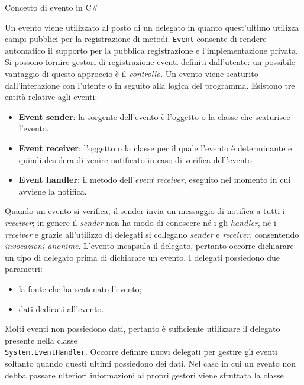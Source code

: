 \begin{problem}{1.8}
Concetto di evento in C\#
\end{problem}
\begin{solution}
Un evento viene utilizzato al posto di un delegato in quanto quest’ultimo utilizza campi pubblici per la registrazione di
metodi.
\newline
\texttt{Event} consente di rendere automatico il supporto per la pubblica registrazione e l’implementazione privata.
\newline
Si possono fornire gestori di registrazione eventi definiti dall’utente: un possibile vantaggio di questo approccio è il
\textit{controllo}.
\newline
Un evento viene scaturito dall’interazione con l’utente o in seguito alla logica del programma.
Esistono tre entità relative agli eventi:
\begin{itemize}
	\item \textbf{Event sender}: la sorgente dell’evento è l’oggetto o la classe che scaturisce l’evento.
	\item \textbf{Event receiver}: l’oggetto o la classe per il quale l’evento è determinante e quindi desidera di venire notificato
   in caso di verifica dell’evento
	\item \textbf{Event handler}: il metodo dell’\textit{event receiver}, eseguito nel momento in cui avviene la notifica.
\end{itemize}
Quando un evento si verifica, il sender invia un messaggio di notifica a tutti i \textit{receiver}; in genere il \textit{sender} non ha modo
di conoscere né i gli \textit{handler}, né i \textit{receiver} e grazie all’utilizzo di delegati si collegano \textit{sender} e \textit{receiver}, consentendo
\textit{invocazioni anonime}.
L’evento incapsula il delegato, pertanto occorre dichiarare un tipo di delegato prima di dichiarare un evento.
I delegati possiedono due parametri:
\begin{itemize}
	\item la fonte che ha scatenato l’evento;
	\item dati dedicati all’evento.
\end{itemize}
Molti eventi non possiedono dati, pertanto è sufficiente utilizzare il delegato presente nella classe
\\\texttt{System.EventHandler}. Occorre definire nuovi delegati per gestire gli eventi soltanto quando questi ultimi possiedono
dei dati.
Nel caso in cui un evento non debba passare ulteriori informazioni ai propri gestori viene sfruttata la classe

\end{solution}
